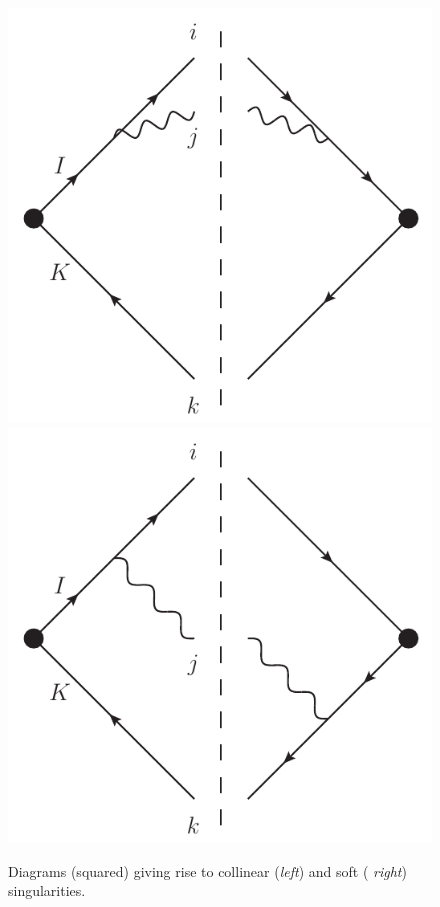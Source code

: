 \begin{figure}[t]
\centering
\includegraphics*[scale=0.5]{radColl}\hspace*{1cm}
\includegraphics*[scale=0.5]{radSoft}
\caption{Diagrams (squared) giving rise to collinear ({\sl left}) and soft ({\sl
right}) singularities.  
 \label{fig:SoftColl}}
\end{figure}
